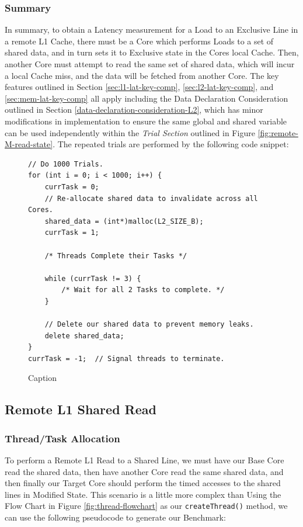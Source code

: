 \documentclass[bsc,frontabs,twoside,singlespacing,parskip,deptreport]{infthesis}     %
\begin{document}
\subsubsection{Summary}
In summary, to obtain a Latency measurement for a Load to an Exclusive Line in a remote L1 Cache, there must be a Core which performs Loads to a set of shared data, and in turn sets it to Exclusive state in the Cores local Cache. Then, another Core must attempt to read the same set of shared data, which will incur a local Cache miss, and the data will be fetched from another Core. The key features outlined in Section \ref{sec:l1-lat-key-comp}, \ref{sec:l2-lat-key-comp}, and \ref{sec:mem-lat-key-comp} all apply including the Data Declaration Consideration outlined in Section \ref{data-declaration-consideration-L2}, which has minor modifications in implementation to ensure the same global and shared variable can be used independently within the \textit{Trial Section} outlined in Figure \ref{fig:remote-M-read-state}. The repeated trials are performed by the following code snippet:
\begin{figure}[!h]
    \centering
    \begin{minipage}{0.8\textwidth}
    \begin{verbatim}
// Do 1000 Trials.
for (int i = 0; i < 1000; i++) {
    currTask = 0;
    // Re-allocate shared data to invalidate across all Cores.
    shared_data = (int*)malloc(L2_SIZE_B);
    currTask = 1;

    /* Threads Complete their Tasks */
        
    while (currTask != 3) {
        /* Wait for all 2 Tasks to complete. */
    }

    // Delete our shared data to prevent memory leaks.
    delete shared_data;
}
currTask = -1;  // Signal threads to terminate.
    \end{verbatim}
    \end{minipage}
    \caption{Caption}
    \label{fig:remote-E-repeat}
\end{figure}

\subsection{Remote L1 Shared Read}
\subsubsection{Thread/Task Allocation}
To perform a Remote L1 Read to a Shared Line, we must have our Base Core read the shared data, then have another Core read the same shared data, and then finally our Target Core should perform the timed accesses to the shared lines in Modified State. This scenario is a little more complex than  Using the Flow Chart in Figure \ref{fig:thread-flowchart} as our \texttt{createThread()} method, we can use the following pseudocode to generate our Benchmark:
\end{document}
